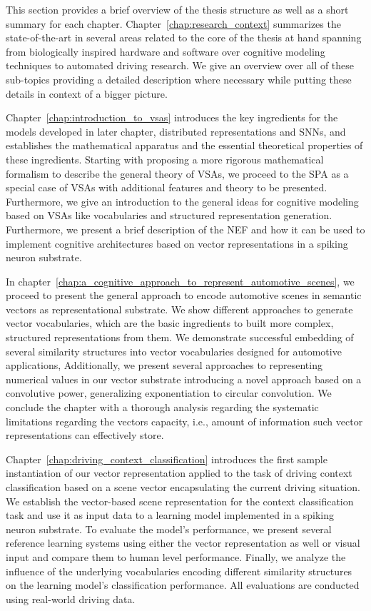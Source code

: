This section provides a brief overview of the thesis structure as well as a short summary for each chapter.
Chapter~\ref{chap:research_context} summarizes the state-of-the-art in several areas related to the core of the thesis at hand spanning from biologically inspired hardware and software over cognitive modeling techniques to automated driving research.
We give an overview over all of these sub-topics providing a detailed description where necessary while putting these details in context of a bigger picture.

Chapter~\ref{chap:introduction_to_vsas} introduces the key ingredients for the models developed in later chapter, distributed representations and \acp{SNN}, and establishes the mathematical apparatus and the essential theoretical properties of these ingredients.
Starting with proposing a more rigorous mathematical formalism to describe the general theory of \acp{VSA}, we proceed to the \ac{SPA} as a special case of \acp{VSA} with additional features and theory to be presented.
Furthermore, we give an introduction to the general ideas for cognitive modeling based on \acp{VSA} like vocabularies and structured representation generation.
Furthermore, we present a brief description of the \ac{NEF} and how it can be used to implement cognitive architectures based on vector representations in a spiking neuron substrate.

In chapter~\ref{chap:a_cognitive_approach_to_represent_automotive_scenes}, we proceed to present the general approach to encode automotive scenes in semantic vectors as representational substrate.
We show different approaches to generate vector vocabularies, which are the basic ingredients to built more complex, structured representations from them.
We demonstrate successful embedding of several similarity structures into vector vocabularies designed for automotive applications,
Additionally, we present several approaches to representing numerical values in our vector substrate introducing a novel approach based on a convolutive power, generalizing exponentiation to circular convolution.
We conclude the chapter with a thorough analysis regarding the systematic limitations regarding the vectors capacity, i.e., amount of information such vector representations can effectively store.

Chapter~\ref{chap:driving_context_classification} introduces the first sample instantiation of our vector representation applied to the task of driving context classification based on a scene vector encapsulating the current driving situation.
We establish the vector-based scene representation for the context classification task and use it as input data to a learning model implemented in a spiking neuron substrate.
To evaluate the model's performance, we present several reference learning systems using either the vector representation as well or visual input and compare them to human level performance.
Finally, we analyze the influence of the underlying vocabularies encoding different similarity structures on the learning model's classification performance.
All evaluations are conducted using real-world driving data.

